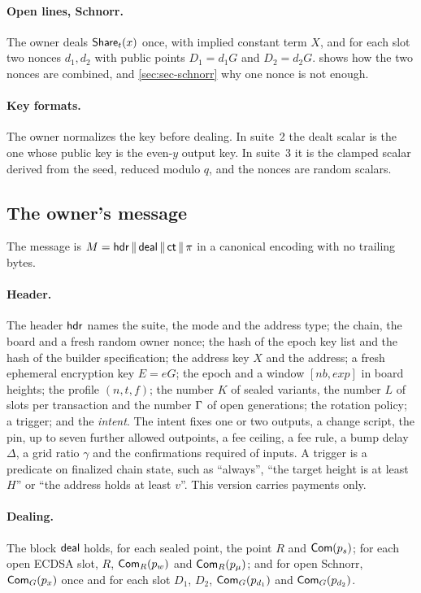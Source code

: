 \paragraph{Open lines, Schnorr.} The owner deals $\mathsf{Share}_t(x)$ once, with implied constant term $X$, and for each slot two nonces $d_1, d_2$ with public points $D_1 = d_1 G$ and $D_2 = d_2 G$.  shows how the two nonces are combined, and \cref{sec:sec-schnorr} why one nonce is not enough.

\paragraph{Key formats.} The owner normalizes the key before dealing. In suite~2 the dealt scalar is the one whose public key is the even-$y$ output key. In suite~3 it is the clamped scalar derived from the seed, reduced modulo $q$, and the nonces are random scalars.

\subsection{The owner's message}\label{sec:msg}

The message is $M = \mathsf{hdr} \,\|\, \mathsf{deal} \,\|\, \mathsf{ct} \,\|\, \pi$ in a canonical encoding with no trailing bytes.

\paragraph{Header.} The header $\mathsf{hdr}$ names the suite, the mode and the address type; the chain, the board and a fresh random owner nonce; the hash of the epoch key list and the hash of the builder specification; the address key $X$ and the address; a fresh ephemeral encryption key $E = eG$; the epoch and a window $[nb, exp]$ in board heights; the profile $(n,t,f)$; the number $K$ of sealed variants, the number $L$ of slots per transaction and the number $\Gamma$ of open generations; the rotation policy; a trigger; and the \emph{intent}. The intent fixes one or two outputs, a change script, the pin, up to seven further allowed outpoints, a fee ceiling, a fee rule, a bump delay $\Delta$, a grid ratio $\gamma$ and the confirmations required of inputs. A trigger is a predicate on finalized chain state, such as ``always'', ``the target height is at least $H$'' or ``the address holds at least $v$''. This version carries payments only.

\paragraph{Dealing.} The block $\mathsf{deal}$ holds, for each sealed point, the point $R$ and $\mathsf{Com}(p_s)$; for each open ECDSA slot, $R$, $\mathsf{Com}_R(p_w)$ and $\mathsf{Com}_R(p_\mu)$; and for open Schnorr, $\mathsf{Com}_G(p_x)$ once and for each slot $D_1$, $D_2$, $\mathsf{Com}_G(p_{d_1})$ and $\mathsf{Com}_G(p_{d_2})$.

